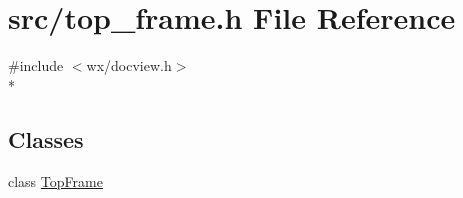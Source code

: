 \hypertarget{a00249}{\section{src/top\-\_\-frame.h File Reference}
\label{a00249}
}
{\ttfamily \#include $<$wx/docview.\-h$>$}\\*
\subsection*{Classes}
\begin{DoxyCompactItemize}
\item 
class \hyperlink{a00146}{Top\-Frame}
\end{DoxyCompactItemize}
